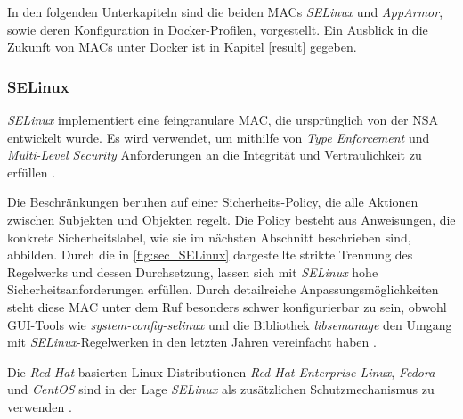 \documentclass[../main.tex]{subfiles}
\begin{document}




			In den folgenden Unterkapiteln sind die beiden MACs \emph{SELinux} und \emph{AppArmor}, sowie deren Konfiguration in Docker-Profilen, vorgestellt. Ein Ausblick in die Zukunft von MACs unter Docker ist in Kapitel \ref{result} gegeben.

  		\subsubsection{\acrshort{SELinux}}
				\emph{SELinux} implementiert eine feingranulare MAC, die ursprünglich von der NSA entwickelt wurde. Es wird verwendet, um mithilfe von \emph{Type Enforcement} und \emph{Multi-Level Security} Anforderungen an die Integrität und Vertraulichkeit zu erfüllen \cite{redhatSec}. %


				Die Beschränkungen beruhen auf einer Sicherheits-Policy, die alle Aktionen zwischen Subjekten und Objekten regelt. Die Policy besteht aus Anweisungen, die konkrete Sicherheitslabel, wie sie im nächsten Abschnitt beschrieben sind, abbilden. Durch die in \fig \ref{fig:sec_SELinux} dargestellte strikte Trennung des Regelwerks und dessen Durchsetzung, lassen sich mit \emph{SELinux} hohe Sicherheitsanforderungen erfüllen. Durch detailreiche Anpassungsmöglichkeiten steht diese MAC unter dem Ruf besonders schwer konfigurierbar zu sein, obwohl GUI-Tools wie \emph{system-config-selinux} und die Bibliothek \emph{libsemanage} den Umgang mit \emph{SELinux}-Regelwerken in den letzten Jahren vereinfacht haben \cite[S.62,S.67]{linuxMagazineSec}.

				Die \emph{Red Hat}-basierten Linux-Distributionen \emph{Red Hat Enterprise Linux}, \emph{Fedora} und \emph{CentOS} sind in der Lage \emph{SELinux} als zusätzlichen Schutzmechanismus zu verwenden \cite{dockerSecurity}.
\end{document}
